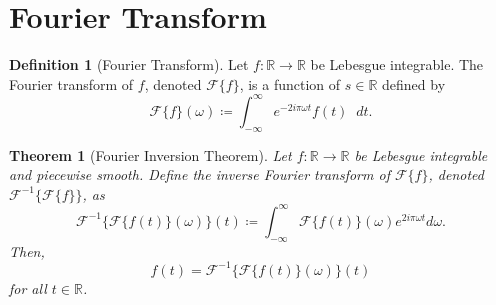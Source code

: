 \documentclass[a4paper]{article}
\newcommand*\diff{\mathop{}\!d} %
\newtheorem{theorem}{Theorem}
\theoremstyle{definition}
\newtheorem{definition}{Definition}
\begin{document}
\section{Fourier Transform}

\begin{definition}[Fourier Transform]
    Let $f: \mathbb{R} \to \mathbb{R}$ be Lebesgue integrable.
    The Fourier transform of $f$, denoted $\mathscr{F}\{f\}$, is a function of $s \in \mathbb{R}$ defined by
    \begin{equation}
        \mathscr{F}\{f\} (\omega) \coloneq \int_{-\infty}^{\infty} e^{-2i\pi \omega t} f(t) \diff t.
    \end{equation}
\end{definition}
\begin{theorem}[Fourier Inversion Theorem] \label{thm:Fourier inversion theorem}
    Let $f: \mathbb{R} \to \mathbb{R}$ be Lebesgue integrable and piecewise smooth.
    Define the inverse Fourier transform of $\mathscr{F}\{f\}$, denoted $\mathscr{F}^{-1}\{\mathscr{F}\{f\}\}$, as
    \begin{equation}
        \mathscr{F}^{-1}\{\mathscr{F}\{f(t)\}(\omega)\}(t) \coloneq \int_{-\infty}^{\infty} \mathscr{F}\{f(t)\}(\omega) e^{2i\pi\omega t} d\omega.
    \end{equation}
    Then,
    \begin{equation*}
        f(t) = \mathscr{F}^{-1}\{\mathscr{F}\{f(t)\}(\omega)\}(t)
    \end{equation*}
    for all $t \in \mathbb{R}$.
\end{theorem}
\end{document}
